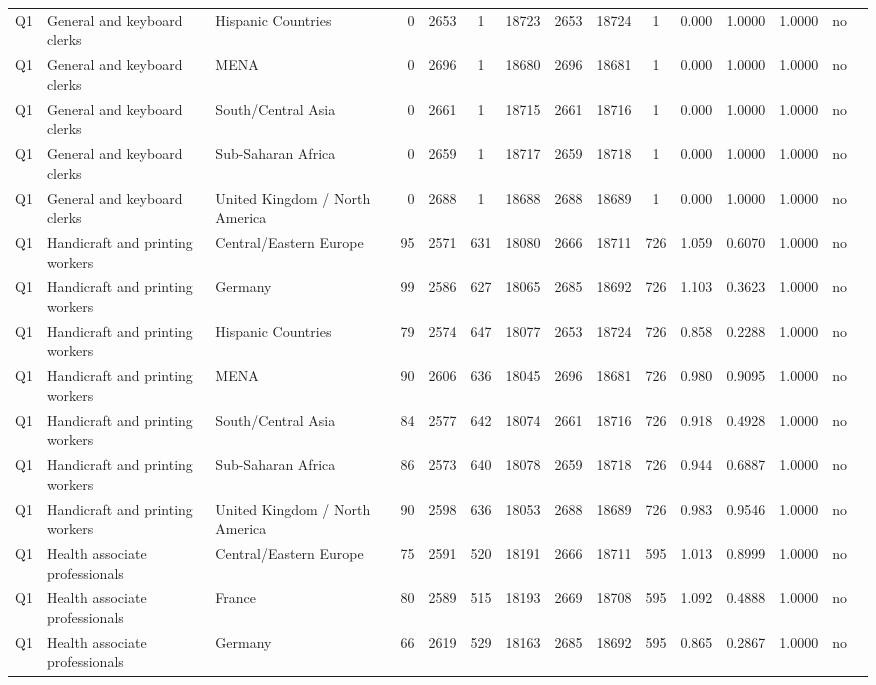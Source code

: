 \begin{longtable}{lllrcccccccccll}
Q1 & General and keyboard clerks & Hispanic Countries & 0 & 2653 & 1 & 18723 & 2653 & 18724 & 1 & 0.000 & 1.0000 & 1.0000 & no \\
Q1 & General and keyboard clerks & MENA & 0 & 2696 & 1 & 18680 & 2696 & 18681 & 1 & 0.000 & 1.0000 & 1.0000 & no \\
Q1 & General and keyboard clerks & South/Central Asia & 0 & 2661 & 1 & 18715 & 2661 & 18716 & 1 & 0.000 & 1.0000 & 1.0000 & no \\
Q1 & General and keyboard clerks & Sub-Saharan Africa & 0 & 2659 & 1 & 18717 & 2659 & 18718 & 1 & 0.000 & 1.0000 & 1.0000 & no \\
Q1 & General and keyboard clerks & United Kingdom / North America & 0 & 2688 & 1 & 18688 & 2688 & 18689 & 1 & 0.000 & 1.0000 & 1.0000 & no \\
Q1 & Handicraft and printing workers & Central/Eastern Europe & 95 & 2571 & 631 & 18080 & 2666 & 18711 & 726 & 1.059 & 0.6070 & 1.0000 & no \\
Q1 & Handicraft and printing workers & Germany & 99 & 2586 & 627 & 18065 & 2685 & 18692 & 726 & 1.103 & 0.3623 & 1.0000 & no \\
Q1 & Handicraft and printing workers & Hispanic Countries & 79 & 2574 & 647 & 18077 & 2653 & 18724 & 726 & 0.858 & 0.2288 & 1.0000 & no \\
Q1 & Handicraft and printing workers & MENA & 90 & 2606 & 636 & 18045 & 2696 & 18681 & 726 & 0.980 & 0.9095 & 1.0000 & no \\
Q1 & Handicraft and printing workers & South/Central Asia & 84 & 2577 & 642 & 18074 & 2661 & 18716 & 726 & 0.918 & 0.4928 & 1.0000 & no \\
Q1 & Handicraft and printing workers & Sub-Saharan Africa & 86 & 2573 & 640 & 18078 & 2659 & 18718 & 726 & 0.944 & 0.6887 & 1.0000 & no \\
Q1 & Handicraft and printing workers & United Kingdom / North America & 90 & 2598 & 636 & 18053 & 2688 & 18689 & 726 & 0.983 & 0.9546 & 1.0000 & no \\
Q1 & Health associate professionals & Central/Eastern Europe & 75 & 2591 & 520 & 18191 & 2666 & 18711 & 595 & 1.013 & 0.8999 & 1.0000 & no \\
Q1 & Health associate professionals & France & 80 & 2589 & 515 & 18193 & 2669 & 18708 & 595 & 1.092 & 0.4888 & 1.0000 & no \\
Q1 & Health associate professionals & Germany & 66 & 2619 & 529 & 18163 & 2685 & 18692 & 595 & 0.865 & 0.2867 & 1.0000 & no \\

\end{longtable}
